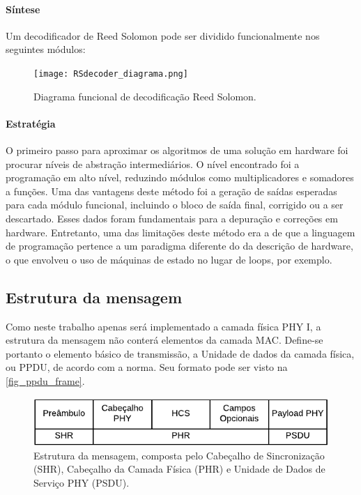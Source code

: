 	\paragraph{Síntese}
	
	Um decodificador de Reed Solomon pode ser dividido funcionalmente nos seguintes módulos:

	\begin{figure}[!htb]
		\caption{\label{RSDecoder_diagrama_logico} Diagrama funcional de decodificação Reed Solomon.}
		\centering
		\texttt{[image: RSdecoder\_diagrama.png]}
	\end{figure}
	
	\paragraph{Estratégia}
	
	O primeiro passo para aproximar os algoritmos de uma solução em hardware foi procurar níveis de abstração intermediários. O nível encontrado foi a programação em alto nível, reduzindo módulos como multiplicadores e somadores a funções. Uma das vantagens deste método foi a geração de saídas esperadas para cada módulo funcional, incluindo o bloco de saída final, corrigido ou a ser descartado. Esses dados foram fundamentais para a depuração e correções em hardware. Entretanto, uma das limitações deste método era a de que a linguagem de programação pertence a um paradigma diferente do da descrição de hardware, o que envolveu o uso de máquinas de estado no lugar de loops, por exemplo.  
	
	\subsection{Estrutura da mensagem}
	
	Como neste trabalho apenas será implementado a camada física PHY I, a estrutura da mensagem não conterá elementos da camada MAC. Define-se portanto o elemento básico de transmissão, a Unidade de dados da camada física, ou PPDU, de acordo com a norma. Seu formato pode ser visto na \autoref{fig_ppdu_frame}.
	
	\begin{figure}[h]
		\caption{\label{fig_ppdu_frame} Estrutura da mensagem, composta pelo Cabeçalho de Sincronização (SHR), Cabeçalho da Camada Física (PHR) e Unidade de Dados de Serviço PHY (PSDU).}
		\centering
		\includegraphics[width=0.5\textheight]{frame/PPDU.pdf}
	\end{figure}

